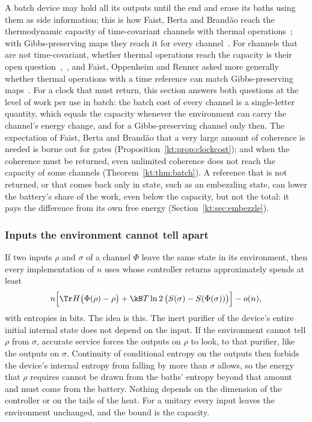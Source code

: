 A batch device may hold all its outputs until the end and erase its baths using them as side information; this is how Faist, Berta and Brand\~ao reach the thermodynamic capacity of time-covariant channels with thermal operations~\cite[Sec.~7]{FBB21}; with Gibbs-preserving maps they reach it for every channel~\cite[Sec.~6]{FBB21}. For channels that are not time-covariant, whether thermal operations reach the capacity is their open question~\cite{FBB19},~\cite[Sec.~9]{FBB21}, and Faist, Oppenheim and Renner asked more generally whether thermal operations with a time reference can match Gibbs-preserving maps~\cite{FOR15}. For a clock that must return, this section answers both questions at the level of work per use in batch: the batch cost of every channel is a single-letter quantity, which equals the capacity whenever the environment can carry the channel's energy change, and for a Gibbs-preserving channel only then. The expectation of Faist, Berta and Brand\~ao that a very large amount of coherence is needed is borne out for gates (Proposition~\ref{kt:prop:clockcost}); and when the coherence must be returned, even unlimited coherence does not reach the capacity of some channels (Theorem~\ref{kt:thm:batch}). A reference that is not returned, or that comes back only in state, such as an embezzling state, can lower the battery's share of the work, even below the capacity, but not the total: it pays the difference from its own free energy (Section~\ref{kt:sec:embezzle}).

\subsubsection{Inputs the environment cannot tell apart}

If two inputs $\rho$ and $\sigma$ of a channel $\Phi$ leave the same state in its environment, then every implementation of $n$ uses whose controller returns approximately spends at least
\[
n\Bigl[\Tr H\bigl(\Phi(\rho)-\rho\bigr)+\kB T\ln2\,\bigl(S(\sigma)-S(\Phi(\sigma))\bigr)\Bigr]-o(n),
\]
with entropies in bits. The idea is this. The inert purifier of the device's entire initial internal state does not depend on the input. If the environment cannot tell $\rho$ from $\sigma$, accurate service forces the outputs on $\rho$ to look, to that purifier, like the outputs on $\sigma$. Continuity of conditional entropy on the outputs then forbids the device's internal entropy from falling by more than $\sigma$ allows, so the energy that $\rho$ requires cannot be drawn from the baths' entropy beyond that amount and must come from the battery. Nothing depends on the dimension of the controller or on the tails of the heat. For a unitary every input leaves the environment unchanged, and the bound is the capacity.


